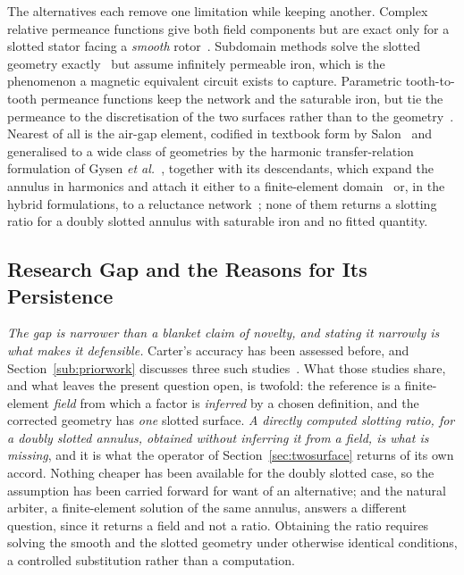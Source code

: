 \documentclass[10pt,a4paper,twocolumn]{article}
\theoremstyle{plain}
\theoremstyle{remark}
\begin{document}
The alternatives each remove one limitation while keeping another.
Complex relative permeance functions give both field components but are
exact only for a slotted stator facing a \emph{smooth}
rotor~\cite{zarko2006b}. Subdomain methods solve the slotted geometry
exactly~\cite{lubin2010} but assume infinitely permeable iron, which is
the phenomenon a magnetic equivalent circuit exists to capture.
Parametric tooth-to-tooth permeance functions keep the network and the
saturable iron, but tie the permeance to the discretisation of the two
surfaces rather than to the geometry~\cite{silva2023}. Nearest of all
is the air-gap element, codified in textbook form by
Salon~\cite{salon1995} and generalised to a wide class of geometries by
the harmonic transfer-relation formulation of Gysen \emph{et
al.}~\cite{gysen2010}, together with its descendants, which expand the
annulus in
harmonics and attach it either to a finite-element
domain~\cite{abdelrazek1982,degersem2004} or, in the hybrid
formulations, to a reluctance network~\cite{ouagued2016,belmahi2026};
none of them returns a
slotting ratio for a doubly slotted annulus with saturable iron and no
fitted quantity.

\subsection{Research Gap and the Reasons for Its Persistence}

\emph{The gap is narrower than a blanket claim of novelty, and stating it
narrowly is what makes it defensible.} Carter's accuracy has been
assessed before, and Section~\ref{sub:priorwork} discusses three such
studies~\cite{viorel2007,viorel2014,sharifian2003}. What those studies
share, and what leaves the present question open, is twofold: the
reference is a finite-element \emph{field} from which a factor is
\emph{inferred} by a chosen definition, and the corrected geometry has
\emph{one} slotted surface. \emph{A directly computed slotting ratio,
for a doubly slotted annulus, obtained without inferring it from a field,
is what is missing}, and it is what the operator of
Section~\ref{sec:twosurface} returns of its own accord. Nothing cheaper has been available for
the doubly slotted case, so the assumption has been carried forward for
want of an alternative; and the natural arbiter, a finite-element
solution of the same annulus, answers a different question, since it
returns a field and not a ratio. Obtaining the ratio requires solving
the smooth and the slotted geometry under otherwise identical
conditions, a controlled substitution rather than a computation.
\end{document}
